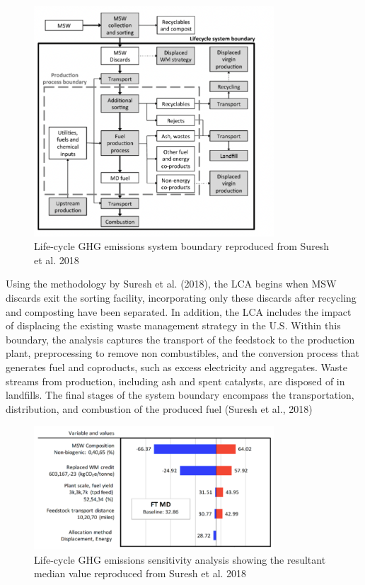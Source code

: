 \documentclass[12pt]{article}
\begin{document}
\begin{Appendix}
\begin{figure}[H]
\centering
\includegraphics[width=0.8\textwidth]{Fig 9.png} %
\caption{Life-cycle GHG emissions system boundary reproduced from Suresh et al. 2018}
\label{figure8}
\end{figure}

Using the methodology by Suresh et al. (2018), the LCA begins when MSW discards exit the sorting facility, incorporating only these discards after recycling and composting have been separated.  In addition, the LCA includes the impact of displacing the existing waste management strategy in the U.S. Within this boundary, the analysis captures the transport of the feedstock to the production plant, preprocessing to remove non combustibles, and the conversion process that generates fuel and coproducts, such as excess electricity and aggregates. Waste streams from production, including ash and spent catalysts, are disposed of in landfills. The final stages of the system boundary encompass the transportation, distribution, and combustion of the produced fuel (Suresh et al., 2018)

\begin{figure}[H]
\centering
\includegraphics[width=0.8\textwidth]{Fig 11.png} %
\caption{Life-cycle GHG emissions sensitivity analysis showing the resultant median value reproduced from Suresh et al. 2018}
\label{fig:figure11}
\end{figure}


\end{Appendix}
\end{document}
